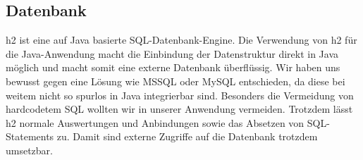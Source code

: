 \subsection{Datenbank}
h2 ist eine auf Java basierte SQL-Datenbank-Engine. Die Verwendung von h2 für die Java-Anwendung macht die Einbindung der Datenstruktur direkt in Java möglich und macht somit eine externe Datenbank überflüssig. Wir haben uns bewusst gegen eine Lösung wie MSSQL oder MySQL entschieden, da diese bei weitem nicht so spurlos in Java integrierbar sind. Besonders die Vermeidung von hardcodetem SQL wollten wir in unserer Anwendung vermeiden. Trotzdem lässt h2 normale Auswertungen und Anbindungen sowie das Absetzen von SQL-Statements zu. Damit sind externe Zugriffe auf die Datenbank trotzdem umsetzbar.
%
%
